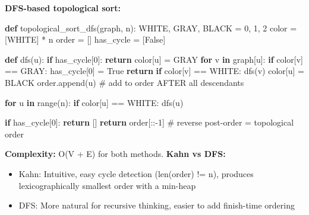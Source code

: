 \documentclass[11pt]{article}
\providecommand{\tightlist}{\setlength{\itemsep}{1pt}\setlength{\parskip}{0pt}}
\newenvironment{Shaded}{\begin{snugshade}}{\end{snugshade}}
\newcommand{\BuiltInTok}[1]{\textcolor[rgb]{0.50,0.55,0.55}{#1}}
\newcommand{\CommentTok}[1]{\textcolor[rgb]{0.48,0.49,0.49}{#1}}
\newcommand{\ControlFlowTok}[1]{\textcolor[rgb]{0.99,0.74,0.29}{\textbf{#1}}}
\newcommand{\DecValTok}[1]{\textcolor[rgb]{0.96,0.45,0.00}{#1}}
\newcommand{\KeywordTok}[1]{\textcolor[rgb]{0.81,0.81,0.76}{\textbf{#1}}}
\newcommand{\NormalTok}[1]{\textcolor[rgb]{0.81,0.81,0.76}{#1}}
\newcommand{\OperatorTok}[1]{\textcolor[rgb]{0.81,0.81,0.76}{#1}}
\newcommand{\VariableTok}[1]{\textcolor[rgb]{0.15,0.68,0.68}{#1}}
\begin{document}
\textbf{DFS-based topological sort:}


\begin{Shaded}
\begin{Highlighting}[]
\KeywordTok{def}\NormalTok{ topological\_sort\_dfs(graph, n):}
\NormalTok{    WHITE, GRAY, BLACK }\OperatorTok{=} \DecValTok{0}\NormalTok{, }\DecValTok{1}\NormalTok{, }\DecValTok{2}
\NormalTok{    color }\OperatorTok{=}\NormalTok{ [WHITE] }\OperatorTok{*}\NormalTok{ n}
\NormalTok{    order }\OperatorTok{=}\NormalTok{ []}
\NormalTok{    has\_cycle }\OperatorTok{=}\NormalTok{ [}\VariableTok{False}\NormalTok{]}

    \KeywordTok{def}\NormalTok{ dfs(u):}
        \ControlFlowTok{if}\NormalTok{ has\_cycle[}\DecValTok{0}\NormalTok{]: }\ControlFlowTok{return}
\NormalTok{        color[u] }\OperatorTok{=}\NormalTok{ GRAY}
        \ControlFlowTok{for}\NormalTok{ v }\KeywordTok{in}\NormalTok{ graph[u]:}
            \ControlFlowTok{if}\NormalTok{ color[v] }\OperatorTok{==}\NormalTok{ GRAY:}
\NormalTok{                has\_cycle[}\DecValTok{0}\NormalTok{] }\OperatorTok{=} \VariableTok{True}
                \ControlFlowTok{return}
            \ControlFlowTok{if}\NormalTok{ color[v] }\OperatorTok{==}\NormalTok{ WHITE:}
\NormalTok{                dfs(v)}
\NormalTok{        color[u] }\OperatorTok{=}\NormalTok{ BLACK}
\NormalTok{        order.append(u)   }\CommentTok{\# add to order AFTER all descendants}

    \ControlFlowTok{for}\NormalTok{ u }\KeywordTok{in} \BuiltInTok{range}\NormalTok{(n):}
        \ControlFlowTok{if}\NormalTok{ color[u] }\OperatorTok{==}\NormalTok{ WHITE:}
\NormalTok{            dfs(u)}

    \ControlFlowTok{if}\NormalTok{ has\_cycle[}\DecValTok{0}\NormalTok{]:}
        \ControlFlowTok{return}\NormalTok{ []}
    \ControlFlowTok{return}\NormalTok{ order[::}\OperatorTok{{-}}\DecValTok{1}\NormalTok{]    }\CommentTok{\# reverse post{-}order = topological order}
\end{Highlighting}
\end{Shaded}

\textbf{Complexity:} O(V + E) for both methods.
\textbf{Kahn vs DFS:}

\begin{itemize}
\tightlist
\item
  Kahn: Intuitive, easy cycle detection (len(order) != n), produces lexicographically smallest order with a min-heap
\item
  DFS: More natural for recursive thinking, easier to add finish-time ordering
\end{itemize}
\end{document}
